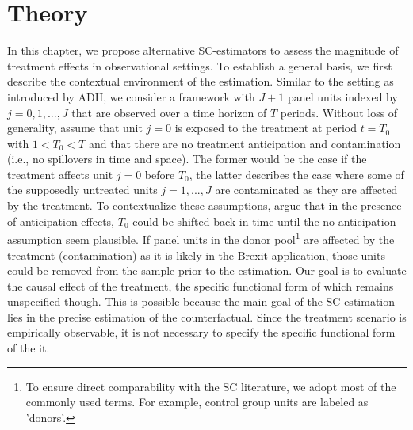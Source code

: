 \section{Theory}
\begin{comment}
\textcolor{magenta}{\textbf{What must be clear by now
	 \begin{itemize}
	 	\item Consider case without covariates
	 	\item Make clear that SC is a weighted average of the donors
	 \end{itemize}}}
\end{comment}
In this chapter, we propose alternative \ac{SC}-estimators to assess the magnitude of treatment effects in observational settings. To establish a general basis, we first describe the contextual environment of the estimation. Similar to the setting as introduced by \ac{ADH}, we consider a framework with $J+1$ panel units indexed by $j = 0,1, ..., J$ that are observed over a time horizon of $T$ periods. Without loss of generality, assume that unit $j = 0$ is exposed to the treatment at period $t = T_0$ with $1 < T_0 < T$ and that there are no treatment anticipation and contamination (i.e., no spillovers in time and space). The former would be the case if the treatment affects unit $j = 0$ before $T_0$, the latter describes the case where some of the supposedly untreated units $j = 1,...,J$ are contaminated as they are affected by the treatment. To contextualize these assumptions, \cite{abadie:2010} argue that in the presence of anticipation effects, $T_0$ could be shifted back in time until the no-anticipation assumption seem plausible. If panel units in the donor pool\footnote{To ensure direct comparability with the \ac{SC} literature, we adopt most of the commonly used terms. For example, control group units are labeled as 'donors'.} are affected by the treatment (contamination) as it is likely in the Brexit-application, those units could be removed from the sample prior to the estimation. Our goal is to evaluate the causal effect of the treatment, the specific functional form of which remains unspecified though. This is possible because the main goal of the \ac{SC}-estimation lies in the precise estimation of the counterfactual. Since the treatment  scenario is empirically observable, it is not necessary to specify the specific functional form of the it. 

